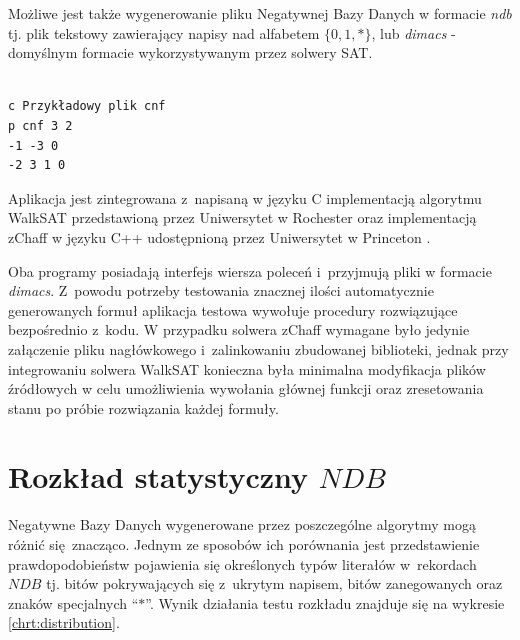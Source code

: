 Możliwe jest także wygenerowanie pliku Negatywnej Bazy Danych w formacie \textit{ndb} tj. plik tekstowy zawierający napisy
nad alfabetem $\{0,1,*\}$, lub \textit{dimacs} - domyślnym formacie wykorzystywanym przez solwery SAT.
\begin{lstlisting}[caption={Przykładowy plik formatu \textit{dimacs}\\Zawartość składa się z~komentarzy (linie zaczynające się znakiem \enquote{c}), definicji problemu (linia zaczynająca się znakiem \enquote{p})
i klauzul logicznych.\\ W tym przypadku opisywany jest problem CNF o~trzech zmiennych i~dwóch klauzulach reprezentujący formułę $(\neg x_1 \lor \neg x_3) \land (\neg x_2 \lor x_3 \lor x_1) $.},captionpos=b]

c Przykładowy plik cnf
p cnf 3 2
-1 -3 0
-2 3 1 0 
\end{lstlisting}

Aplikacja jest zintegrowana z~napisaną w języku C implementacją algorytmu WalkSAT przedstawioną przez Uniwersytet w Rochester \cite{walksat-implementation}
oraz implementacją zChaff w języku C++ udostępnioną przez Uniwersytet w Princeton \cite{zchaff-implementation}.

Oba programy posiadają interfejs wiersza poleceń i~przyjmują pliki w formacie \textit{dimacs}. Z~powodu potrzeby testowania
znacznej ilości automatycznie generowanych formuł aplikacja testowa wywołuje procedury rozwiązujące bezpośrednio z~kodu.
W przypadku solwera zChaff wymagane było jedynie załączenie pliku nagłówkowego i~zalinkowaniu zbudowanej biblioteki, jednak przy integrowaniu
solwera WalkSAT konieczna była minimalna modyfikacja plików źródłowych w celu umożliwienia wywołania głównej funkcji oraz zresetowania
stanu po próbie rozwiązania każdej formuły.


\section{Rozkład statystyczny $NDB$}

Negatywne Bazy Danych wygenerowane przez poszczególne algorytmy mogą różnić się znacząco. Jednym ze sposobów ich porównania jest przedstawienie prawdopodobieństw pojawienia się określonych typów literałów
w~rekordach $NDB$ tj. bitów pokrywających się z~ukrytym napisem, bitów zanegowanych oraz znaków specjalnych \enquote{$*$}. Wynik działania testu rozkładu znajduje się na wykresie \ref{chrt:distribution}.

